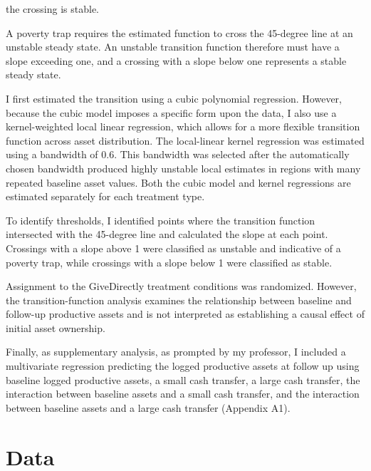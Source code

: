 \documentclass[9pt,twoside]{pnas-new}
\begin{document}
the crossing is stable.

A poverty trap requires the estimated function to cross the 45-degree line at an unstable
steady state. An unstable transition function therefore must have a slope exceeding one, and a
crossing with a slope below one represents a stable steady state.

I first estimated the transition using a cubic polynomial regression. However, because the
cubic model imposes a specific form upon the data, I also use a kernel-weighted local linear
regression, which allows for a more flexible transition function across asset distribution. The local-linear kernel regression was estimated using a bandwidth of 0.6. This bandwidth was selected after the automatically chosen bandwidth produced highly unstable local estimates in regions with many repeated baseline asset values. Both the
cubic model and kernel regressions are estimated separately for each treatment type.

To identify thresholds, I identified points where the transition function intersected with
the 45-degree line and calculated the slope at each point. Crossings with a slope above 1 were
classified as unstable and indicative of a poverty trap, while crossings with a slope below 1
were classified as stable.


Assignment to the GiveDirectly treatment conditions was randomized. However, the transition-function analysis examines the relationship between baseline and follow-up productive assets and is not interpreted as establishing a causal effect of initial asset ownership.


Finally, as supplementary analysis, as prompted by my professor, I included a
multivariate regression predicting the logged productive assets at follow up using baseline
logged productive assets, a small cash transfer, a large cash transfer, the interaction between
baseline assets and a small cash transfer, and the interaction between baseline assets and a large
cash transfer (Appendix A1).



\section{Data}
\end{document}
